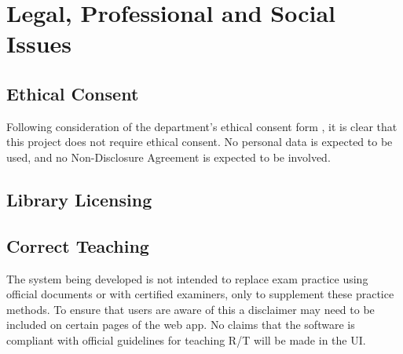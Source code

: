 \section{Legal, Professional and Social Issues}
\subsection{Ethical Consent}
Following consideration of the department's ethical consent form \cite{ethical-consent}, it is clear that this project does not require ethical consent. No personal data is expected to be used, and no Non-Disclosure Agreement is expected to be involved.
\subsection{Library Licensing}
\subsection{Correct Teaching}
The system being developed is not intended to replace exam practice using official documents or with certified examiners, only to supplement these practice methods. To ensure that users are aware of this a disclaimer may need to be included on certain pages of the web app. No claims that the software is compliant with official guidelines for teaching R/T will be made in the UI.